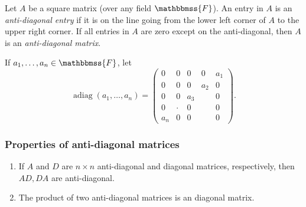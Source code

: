 \documentclass[12pt]{article}
\newcommand{\F}{\mathbbmss{F}}
\begin{document}
Let $A$ be a square matrix (over any field $\F$). An entry in $A$ 
is an \emph{anti-diagonal entry} if it is on the line going from the 
lower left corner of $A$ to the upper right corner. If all 
entries in $A$ are zero except on the anti-diagonal, then $A$ is an 
\emph{anti-diagonal matrix}.

If $a_1, \ldots, a_n \in \F$, let 
$$
  \operatorname{adiag}(a_1, \ldots, a_n) = \begin{pmatrix}
0 & 0     & 0     & 0   & a_1 \\
0 & 0     & 0     & a_2 & 0  \\
0 & 0     & a_{3} &     & 0  \\
0 & \cdot & 0     &     & 0  \\
a_n & 0   & 0     &     &  0
\end{pmatrix}. 
$$

\subsubsection*{Properties of anti-diagonal matrices}
\begin{enumerate}
\item If $A$ and $D$ are $n\times n$ anti-diagonal and 
   diagonal matrices, respectively, then $AD, DA$ are anti-diagonal.
\item The product of two anti-diagonal matrices is an diagonal matrix.
\end{enumerate}
\end{document}
